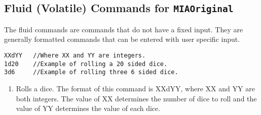 \subsection{Fluid (Volatile) Commands for \texttt{MIAOriginal}}

The fluid commands are commands that do not have a fixed input. They are generally formatted commands that can be entered with user specific input.

\begin{lstlisting} 
XXdYY   //Where XX and YY are integers.
1d20    //Example of rolling a 20 sided dice.
3d6     //Example of rolling three 6 sided dice.
\end{lstlisting}
\begin{enumerate}
	\item[] Rolls a dice. The format of this command is XXdYY, where XX and YY are both integers. The value of XX determines the number of dice to roll and the value of YY determines the value of each dice.
\end{enumerate}